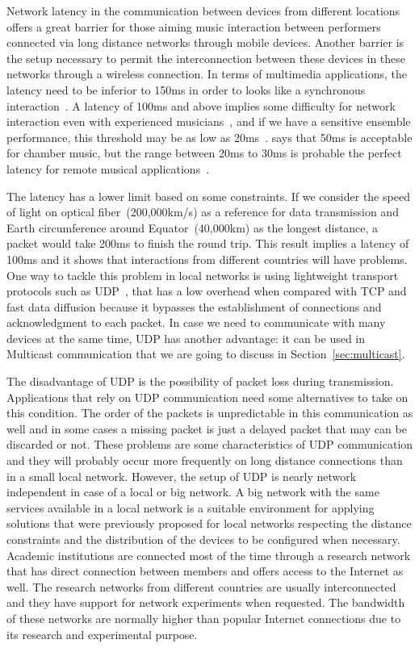 Network latency in the communication between devices from different locations offers a great barrier for those aiming music interaction between performers connected via long distance networks through mobile devices.
Another barrier is the setup necessary to permit the interconnection between these devices in these networks through a wireless connection. 
In terms of multimedia applications, the latency need to be inferior to 150ms in order to looks like a synchronous interaction~\citep{Coulouris2011distributed}.
A latency of 100ms and above implies some difficulty for network interaction even with experienced musicians~\citep{Bartlette2006networkeffect}, and if we have a sensitive ensemble performance, this threshold may be as low as 20ms~\citep{Chafe2004network}.
\cite{Lago2004thequest} says that 50ms is acceptable for chamber music, but the range between 20ms to 30ms is probable the perfect latency for remote musical applications~\citep{Lago2004thequest}. 

The latency has a lower limit based on some constraints.
If we consider the speed of light on optical fiber~(200,000km/s) as a reference for data transmission and Earth circumference around Equator~(40,000km) as the longest distance, a packet would take 200ms to finish the round trip.
This result implies a latency of 100ms and it shows that interactions from different countries will have problems.
One way to tackle this problem in local networks is using lightweight transport protocols such as UDP~\citep{Harker2008laptop,Caceres2010jacktrip}, that has a low overhead when compared with TCP and fast data diffusion because it bypasses the establishment of connections and acknowledgment to each packet.
In case we need to communicate with many devices at the same time, UDP has another advantage: it can be used in Multicast communication that we are going to discuss in Section~\ref{sec:multicast}.   

The disadvantage of UDP is the possibility of packet loss during transmission.
Applications that rely on UDP communication need some alternatives to take on this condition.
The order of the packets is unpredictable in this communication as well and in some cases a missing packet is just a delayed packet that may can be discarded or not.
These problems are some characteristics of UDP communication and they will probably occur more frequently on long distance connections than in a small local network.
However, the setup of UDP is nearly network independent in case of a local or big network.
A big network with the same services available in a local network is a suitable environment for applying solutions that were previously proposed for local networks respecting the distance constraints and the distribution of the devices to be configured when necessary.
Academic institutions are connected most of the time through a research network that has direct connection between members and offers access to the Internet as well.
The research networks from different countries are usually interconnected and they have support for network experiments when requested.
The bandwidth of these networks are normally higher than popular Internet connections due to its research and experimental purpose.

